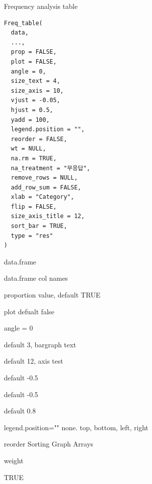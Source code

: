 \documentclass[a4paper]{book}
\begin{document}
%
\begin{Description}
Frequency analysis table
\end{Description}
%
\begin{Usage}
\begin{verbatim}
Freq_table(
  data,
  ...,
  prop = FALSE,
  plot = FALSE,
  angle = 0,
  size_text = 4,
  size_axis = 10,
  vjust = -0.05,
  hjust = 0.5,
  yadd = 100,
  legend.position = "",
  reorder = FALSE,
  wt = NULL,
  na.rm = TRUE,
  na_treatment = "무응답",
  remove_rows = NULL,
  add_row_sum = FALSE,
  xlab = "Category",
  flip = FALSE,
  size_axis_title = 12,
  sort_bar = TRUE,
  type = "res"
)
\end{verbatim}
\end{Usage}
%
\begin{Arguments}
\begin{ldescription}
\item[\code{data}] data.frame

\item[\code{...}] data.frame col names

\item[\code{prop}] proportion value, default TRUE

\item[\code{plot}] plot defualt false

\item[\code{angle}] angle = 0

\item[\code{size\_text}] default 3, bargraph text

\item[\code{size\_axis}] default 12, axis test

\item[\code{vjust}] default -0.5

\item[\code{hjust}] default -0.5

\item[\code{yadd}] default 0.8

\item[\code{legend.position}] legend.position="" none. top, bottom, left, right

\item[\code{reorder}] reorder Sorting Graph Arrays

\item[\code{wt}] weight

\item[\code{na.rm}] TRUE


\end{ldescription}
\end{Arguments}
\end{document}
